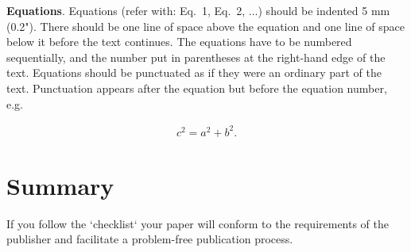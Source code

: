 \documentclass{TTP_DSL2006}
\begin{document}
\vspace{6pt}
\textbf{Equations}.  Equations (refer with: Eq.~1, Eq.~2, ...) should be indented 5 mm (0.2"). 
There should be one line of space above the equation and one line of space below it before the text continues. 
The equations have to be numbered sequentially, and the number put in parentheses at the right-hand edge of the 
text. Equations should be punctuated as if they were an ordinary part of the text. Punctuation appears after the 
equation but before the equation number, e.g.

\begin{eqnarray}
c^2 = a^2 + b^2.
\end{eqnarray}

\section{Summary}
\noindent If you follow the `checklist` your paper will conform to the requirements
 of the publisher and facilitate a problem-free publication process.


\end{document}
